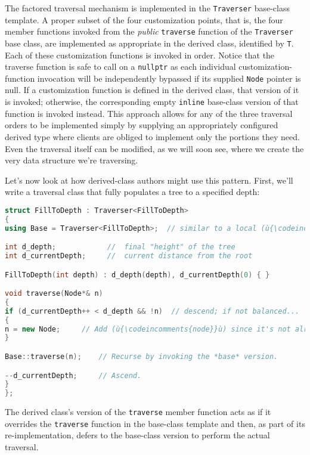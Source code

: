 \noindent The factored traversal mechanism is implemented in the
\texttt{Traverser} base-class template. A proper subset of the four
customization points, that is, the four member functions invoked from
the \emph{public} \texttt{traverse} function of the \texttt{Traverser}
base class, are implemented as appropriate in the derived class,
identified by \texttt{T}. Each of these customization functions is
invoked in order. Notice that the traverse function is safe to call on a
\texttt{nullptr} as each individual customization-function invocation
will be independently bypassed if its supplied \texttt{Node} pointer is
null. If a customization function is defined in the derived class, that
version of it is invoked; otherwise, the corresponding empty
\texttt{inline} base-class version of that function is invoked instead.
This approach allows for any of the three traversal orders to be
implemented simply by supplying an appropriately configured derived type
where clients are obliged to implement only the portions they need. Even
the traversal itself can be modified, as we will soon see, where we
create the very data structure we're traversing.

Let's now look at how derived-class authors might use this pattern.
First, we'll write a traversal class that fully populates a tree to a
specified depth:

\begin{lstlisting}[language=C++]
struct FillToDepth : Traverser<FillToDepth>
{
using Base = Traverser<FillToDepth>;  // similar to a local (ù{\codeincomments{typedef}}ù)

int d_depth;            //  final "height" of the tree
int d_currentDepth;     //  current distance from the root

FillToDepth(int depth) : d_depth(depth), d_currentDepth(0) { }

void traverse(Node*& n)
{
if (d_currentDepth++ < d_depth && !n)  // descend; if not balanced...
{
n = new Node;     // Add (ù{\codeincomments{node}}ù) since it's not already there.
}

Base::traverse(n);    // Recurse by invoking the *base* version.

--d_currentDepth;     // Ascend.
}
};
\end{lstlisting}

\noindent The derived class's version of the \texttt{traverse} member function
acts as if it overrides the \texttt{traverse} function in the base-class
template and then, as part of its re-implementation, defers to the base-class version to perform the actual traversal.

